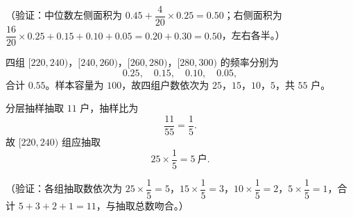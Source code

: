 \begin{answer}
（验证：中位数左侧面积为 \(0.45+\dfrac{4}{20}\times0.25=0.50\)；右侧面积为 \(\dfrac{16}{20}\times0.25+0.15+0.10+0.05=0.20+0.30=0.50\)，左右各半。）


四组 \([220,240)\)，\([240,260)\)，\([260,280)\)，\([280,300)\) 的频率分别为
\nopagebreak[4]
\[
0.25,\quad0.15,\quad0.10,\quad0.05,
\]
合计 \(0.55\)。样本容量为 \(100\)，故四组户数依次为 \(25\)，\(15\)，\(10\)，\(5\)，共 \(55\) 户。

分层抽样抽取 \(11\) 户，抽样比为
\nopagebreak[4]
\[
\dfrac{11}{55}=\dfrac15.
\]
故 \([220,240)\) 组应抽取
\nopagebreak[4]
\[
25\times\dfrac15=5\ \text{户}.
\]

（验证：各组抽取数依次为 \(25\times\dfrac15=5\)，\(15\times\dfrac15=3\)，\(10\times\dfrac15=2\)，\(5\times\dfrac15=1\)，合计 \(5+3+2+1=11\)，与抽取总数吻合。）




\end{answer}
